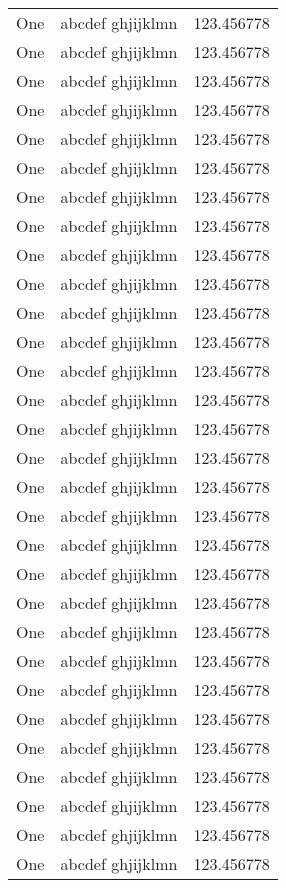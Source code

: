 \begin{longtable}{|l|l|l|}
    One & abcdef ghjijklmn & 123.456778 \\
    One & abcdef ghjijklmn & 123.456778 \\
    One & abcdef ghjijklmn & 123.456778 \\
    One & abcdef ghjijklmn & 123.456778 \\
    One & abcdef ghjijklmn & 123.456778 \\
    One & abcdef ghjijklmn & 123.456778 \\
    One & abcdef ghjijklmn & 123.456778 \\
    One & abcdef ghjijklmn & 123.456778 \\
    One & abcdef ghjijklmn & 123.456778 \\
    One & abcdef ghjijklmn & 123.456778 \\
    One & abcdef ghjijklmn & 123.456778 \\
    One & abcdef ghjijklmn & 123.456778 \\
    One & abcdef ghjijklmn & 123.456778 \\
    One & abcdef ghjijklmn & 123.456778 \\
    One & abcdef ghjijklmn & 123.456778 \\
    One & abcdef ghjijklmn & 123.456778 \\
    One & abcdef ghjijklmn & 123.456778 \\
    One & abcdef ghjijklmn & 123.456778 \\
    One & abcdef ghjijklmn & 123.456778 \\
    One & abcdef ghjijklmn & 123.456778 \\
    One & abcdef ghjijklmn & 123.456778 \\
    One & abcdef ghjijklmn & 123.456778 \\
    One & abcdef ghjijklmn & 123.456778 \\
    One & abcdef ghjijklmn & 123.456778 \\
    One & abcdef ghjijklmn & 123.456778 \\
    One & abcdef ghjijklmn & 123.456778 \\
    One & abcdef ghjijklmn & 123.456778 \\
    One & abcdef ghjijklmn & 123.456778 \\
    One & abcdef ghjijklmn & 123.456778 \\
    One & abcdef ghjijklmn & 123.456778 \\

\end{longtable}
\clearpage